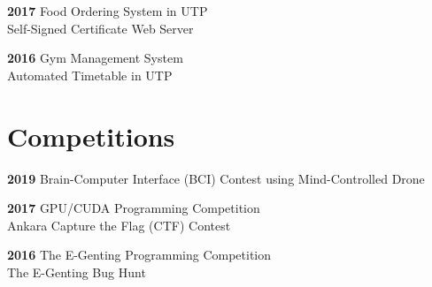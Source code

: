 \documentclass[English]{cv-style}
\begin{document}
\textbf{2017}
    \vspace{0.1mm} {\quad \quad Food Ordering System in UTP} \\
    \vspace{0.1mm} {\quad \quad \quad \quad Self-Signed Certificate Web Server}
    
\textbf{2016}   
    \vspace{0.1mm} {\quad \quad Gym Management System}\\
    \vspace{0.1mm} {\quad \quad \quad \quad Automated Timetable in UTP} 
\section{Competitions}
\vspace{-0.2cm}
\textbf{2019}
    \vspace{0.1mm} {\quad \quad Brain-Computer Interface (BCI) Contest using Mind-Controlled Drone} 
    
\textbf{2017}
    \vspace{0.1mm} {\quad \quad GPU/CUDA Programming Competition} \\
    \vspace{0.1mm} {\quad \quad \quad \quad Ankara Capture the Flag (CTF) Contest}
    
\textbf{2016}   
    \vspace{0.1mm} {\quad \quad The E-Genting Programming Competition} \\
    \vspace{0.1mm} {\quad \quad \quad \quad The E-Genting Bug Hunt}
\end{document}
